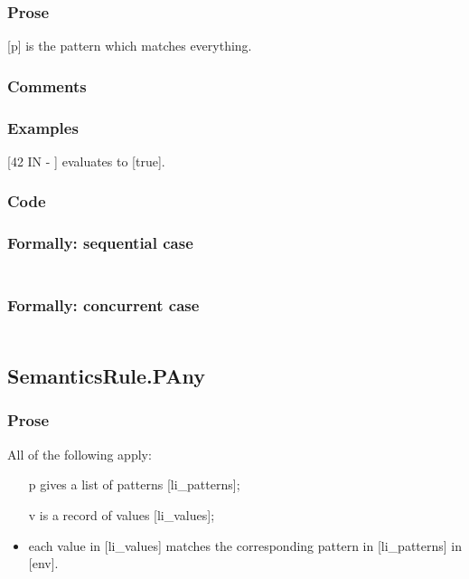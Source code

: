 \documentclass{book}
\begin{document}
  \subsubsection{Prose}
  [p] is the pattern which matches everything.

  \subsubsection{Comments}

  \subsubsection{Examples}
    [42 IN { - }] evaluates to [true].

  \subsubsection{Code}

  \subsubsection{Formally: sequential case}
  \begin{align}
  \end{align} 

  \subsubsection{Formally: concurrent case}
  \begin{align}
  \end{align} 

\subsection{SemanticsRule.PAny \label{sec:SemanticsRule.PAny}}

    \subsubsection{Prose}
    All of the following apply:
    \begin{itemize}
    \item [p] gives a list of patterns [li\_patterns];
    \item [v] is a record of values [li\_values];
    \item each value in [li\_values] matches the corresponding pattern in
      [li\_patterns] in [env].
    \end{itemize}
\end{document}
